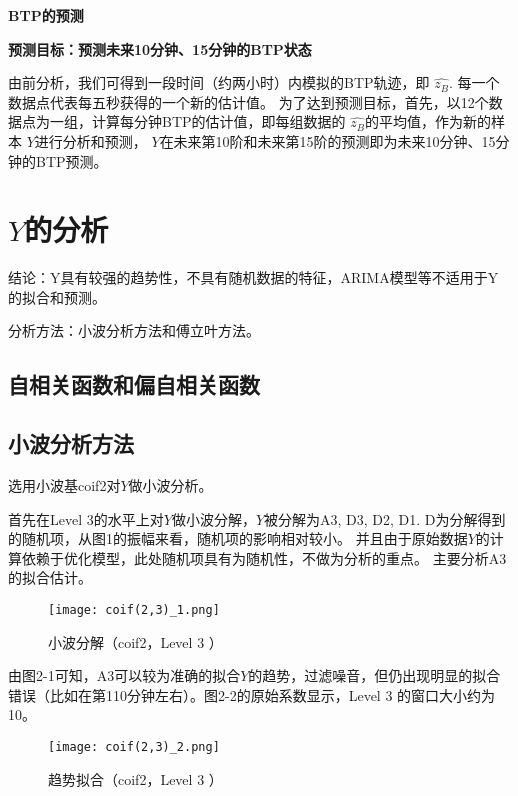 \documentclass[12pt,a4paper]{article}
\begin{document}
\begin{center}
\begin{LARGE}
\textbf{BTP的预测}
\end{LARGE}
\end{center}
\textbf{预测目标：预测未来10分钟、15分钟的BTP状态}

由前分析，我们可得到一段时间（约两小时）内模拟的BTP轨迹，即 
$\widehat{z_{B}}$. 每一个数据点代表每五秒获得的一个新的估计值。
为了达到预测目标，首先，以12个数据点为一组，计算每分钟BTP的估计值，即每组数据的 $\widehat{z_{B}}$的平均值，作为新的样本 $ Y $进行分析和预测， $ Y $在未来第10阶和未来第15阶的预测即为未来10分钟、15分钟的BTP预测。

\section{$Y $的分析}

结论：Y具有较强的趋势性，不具有随机数据的特征，ARIMA模型等不适用于Y的拟合和预测。

分析方法：小波分析方法和傅立叶方法。

\subsection{自相关函数和偏自相关函数}


\subsection{小波分析方法}
 选用小波基coif2对$ Y $做小波分析。
 
 首先在Level 3的水平上对$Y$做小波分解，$ Y $被分解为A3, D3, D2, D1.
 D为分解得到的随机项，从图1的振幅来看，随机项的影响相对较小。
 并且由于原始数据$ Y $的计算依赖于优化模型，此处随机项具有为随机性，不做为分析的重点。
 主要分析A3的拟合估计。
\begin{figure}[H]
 \centering
 \texttt{[image: coif(2,3)\_1.png]}\\
 \caption{小波分解（coif2，Level 3 ）\quad}
\end{figure}

由图2-1可知，A3可以较为准确的拟合$Y$的趋势，过滤噪音，但仍出现明显的拟合错误（比如在第110分钟左右）。图2-2的原始系数显示，Level 3 的窗口大小约为10。
\begin{figure}[H]
 \centering
 \texttt{[image: coif(2,3)\_2.png]}\\
 \caption{趋势拟合（coif2，Level 3 ）\quad}
\end{figure}
\end{document}
